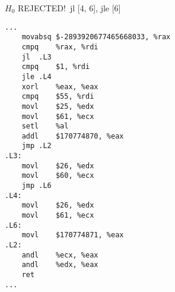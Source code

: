 \begin{figure}[H]
\begin{subfigure}[T]{0.30333333333333334\textwidth}
\begin{lrbox}{\mybox}
%
        \end{lrbox}\resizebox{\textwidth}{!}{\usebox{\mybox}}
\end{subfigure}
\begin{subfigure}[T]{0.30333333333333334\textwidth}
\caption*{}
\end{subfigure}
\begin{subfigure}[T]{0.30333333333333334\textwidth}
\caption*{}
\end{subfigure}
\hspace*{6mm}
\begin{subfigure}[T]{0.2733333333333333\textwidth}
\vspace*{2mm}\tiny {\color{red}$H_0$ REJECTED!}\ \vspace*{2mm}\tiny jl [4, 6], jle [6]
\begin{lstlisting}[style=defstyle,language={[x86masm]Assembler},basicstyle=\tiny\ttfamily,breaklines=true]
...
	movabsq	$-2893920677465668033, %rax
	cmpq	%rax, %rdi
	jl	.L3
	cmpq	$1, %rdi
	jle	.L4
	xorl	%eax, %eax
	cmpq	$55, %rdi
	movl	$25, %edx
	movl	$61, %ecx
	setl	%al
	addl	$170774870, %eax
	jmp	.L2
.L3:
	movl	$26, %edx
	movl	$60, %ecx
	jmp	.L6
.L4:
	movl	$26, %edx
	movl	$61, %ecx
.L6:
	movl	$170774871, %eax
.L2:
	andl	%ecx, %eax
	andl	%edx, %eax
	ret
...\end{lstlisting}
\end{subfigure}
\end{figure}
